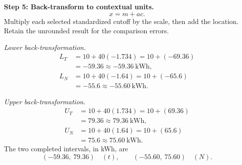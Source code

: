 \begin{enumerate}[leftmargin=*,label=\textbf{\arabic*.},itemsep=12pt,parsep=3pt,topsep=5pt]
\par\noindent\begin{minipage}{\linewidth}
\par\textbf{Step 5: Back-transform to contextual units.}\nopagebreak\enspace \[
x=m+ac.
\]
Multiply each selected standardized cutoff by the scale, then add the location. Retain the unrounded result for the comparison errors.
\par\textit{Lower back-transformation.}
\[
\begin{aligned}L_T&=10+40(-1.734)=10+(-69.36)\\&=-59.36\approx\boxed{-59.36\ \text{kWh}},\\L_N&=10+40(-1.64)=10+(-65.6)\\&=-55.6\approx\boxed{-55.60\ \text{kWh}}.\end{aligned}
\]
\par\textit{Upper back-transformation.}
\[
\begin{aligned}U_T&=10+40(1.734)=10+(69.36)\\&=79.36\approx\boxed{79.36\ \text{kWh}},\\U_N&=10+40(1.64)=10+(65.6)\\&=75.6\approx\boxed{75.60\ \text{kWh}}.\end{aligned}
\]
The two completed intervals, in kWh, are
\[
\boxed{(-59.36,\ 79.36)\quad(t)},\qquad\boxed{(-55.60,\ 75.60)\quad(N)}.
\]


\end{minipage}
\end{enumerate}
